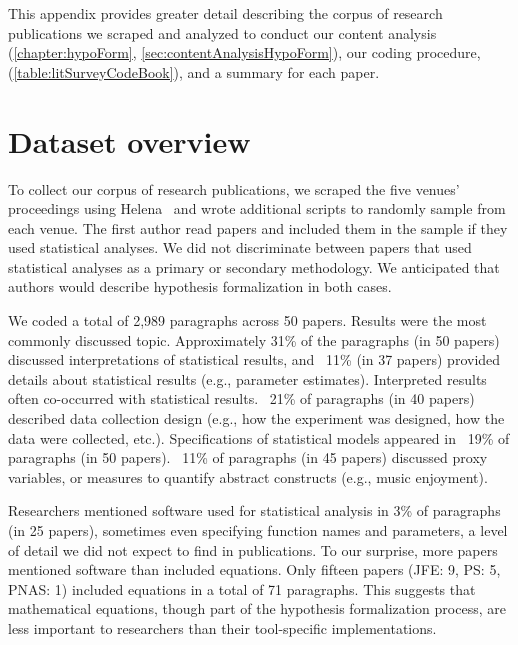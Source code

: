 This appendix provides greater detail describing the corpus of research
publications we scraped and analyzed to conduct our content analysis
(\autoref{chapter:hypoForm}, \autoref{sec:contentAnalysisHypoForm}), our coding
procedure, \codebook (\autoref{table:litSurveyCodeBook}), and a summary for each paper.  

\section{Dataset overview}
To collect our corpus of research publications, we scraped the five venues'
proceedings using Helena~\cite{chasins2018rousillon} and wrote additional
scripts to randomly sample from each venue. The first author read papers and
included them in the sample if they used statistical analyses. We did not
discriminate between papers that used statistical analyses as a primary or
secondary methodology. We anticipated that authors would describe hypothesis
formalization in both cases.

We coded a total of 2,989 paragraphs across 50 papers. Results were the most
commonly discussed topic. Approximately 31\% of the paragraphs (in 50 papers)
discussed interpretations of statistical results, and ~11\% (in 37 papers)
provided details about statistical results (e.g., parameter estimates).
Interpreted results often co-occurred with statistical results. ~21\% of
paragraphs (in 40 papers) described data collection design (e.g., how the
experiment was designed, how the data were collected, etc.). Specifications of
statistical models appeared in ~19\% of paragraphs (in 50 papers). ~11\% of
paragraphs (in 45 papers) discussed proxy variables, or measures to quantify
abstract constructs (e.g., music enjoyment). 

Researchers mentioned software used for statistical analysis in 3\% of
paragraphs (in 25 papers), sometimes even specifying function names and
parameters, a level of detail we did not expect to find in publications. To our
surprise, more papers mentioned software than included equations. Only fifteen
papers (JFE: 9, PS: 5, PNAS: 1) included equations in a total of 71 paragraphs.
This suggests that mathematical equations, though part of the hypothesis
formalization process, are less important to researchers than their
tool-specific implementations.

